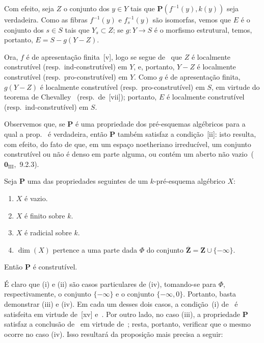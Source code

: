 Com efeito, seja $Z$ o conjunto dos $y\in Y$ tais que $\mathbf{P}(f^{-1}(y),k(y))$ seja verdadeira.
Como as fibras $f^{-1}(y)$ e $f_s^{-1}(y)$ são isomorfas, vemos que $E$ é o conjunto dos $s\in S$ tais que $Y_s\subset Z$; se $g:Y\to S$ é o morfismo estrutural, temos, portanto, $E=S-g(Y-Z)$.


Ora, $f$ é de apresentação finita~[v], logo se segue de~ que $Z$ é localmente construtível (resp.\ ind-construtível) em $Y$, e, portanto, $Y-Z$ é localmente construtível (resp.\ pro-construtível) em $Y$.
Como $g$ é de apresentação finita, $g(Y-Z)$ é localmente construtível (resp.\ pro-construtível) em $S$, em virtude do teorema de Chevalley~ (resp.\ de~[vii]); portanto, $E$ é localmente construtível (resp.\ ind-construtível) em $S$.

\begin{remark}[9.2.5]
\label{IV.9.2.5}
Observemos que, se $\mathbf{P}$ é uma propriedade dos pré-esquemas algébricos para a qual a prop.~ é verdadeira, então $\mathbf{P}$ também satisfaz a condição~[ii]: isto resulta, com efeito, do fato de que, em um espaço noetheriano irreducível, um conjunto construtível ou não é denso em parte alguma, ou contém um aberto não vazio~($\mathbf{0}_{\mathrm{III}}$,~9.2.3).
\end{remark}

\begin{proposition}[9.2.6]
\label{IV.9.2.6}
Seja $\mathbf{P}$ uma das propriedades seguintes de um $k$-pré-esquema algébrico $X$:
\begin{enumerate}[label=(\roman*)]
  \item $X$ é vazio.
  \item $X$ é finito sobre $k$.
  \item $X$ é radicial sobre $k$.
  \item $\dim(X)$ pertence a uma parte dada $\Phi$ do conjunto $\overline{\mathbf{Z}}=\mathbf{Z}\cup\{-\infty\}$.
\end{enumerate}
Então $\mathbf{P}$ é construtível.
\end{proposition}

É claro que (i) e (ii) são casos particulares de (iv), tomando-se para $\Phi$, respectivamente, o conjunto $\{-\infty\}$ e o conjunto $\{-\infty,0\}$.
Portanto, basta demonstrar (iii) e (iv).
Em cada um desses dois casos, a condição~(i) de~ é satisfeita em virtude de~[xv] e~.
Por outro lado, no caso (iii), a propriedade $\mathbf{P}$ satisfaz a conclusão de~ em virtude de~; resta, portanto, verificar que o mesmo ocorre no caso (iv).
Isso resultará da proposição mais precisa a seguir:

